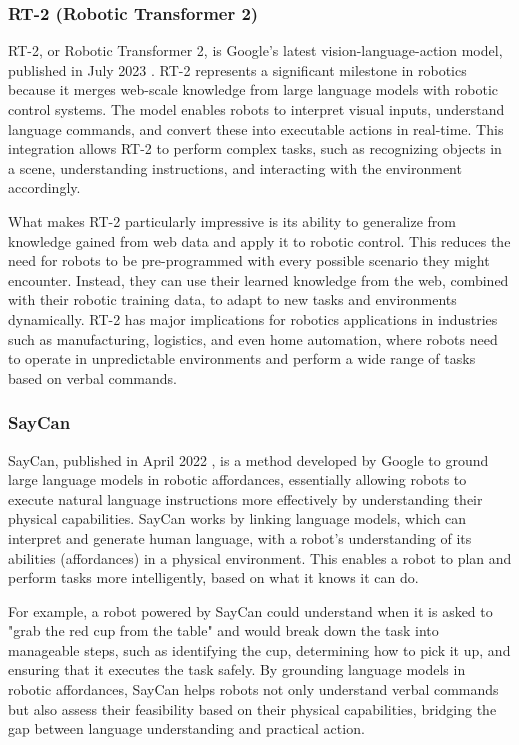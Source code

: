 \subsubsection{RT-2 (Robotic Transformer 2)}

RT-2, or Robotic Transformer 2, is Google's latest vision-language-action model, published in July 2023 \cite{brohan2023rt}. 
RT-2 represents a significant milestone in robotics because it merges web-scale knowledge from large language models with robotic control systems. 
The model enables robots to interpret visual inputs, understand language commands, and convert these into executable actions in real-time. 
This integration allows RT-2 to perform complex tasks, such as recognizing objects in a scene, understanding instructions, and interacting with the environment accordingly.

What makes RT-2 particularly impressive is its ability to generalize from knowledge gained from web data and apply it to robotic control. 
This reduces the need for robots to be pre-programmed with every possible scenario they might encounter. 
Instead, they can use their learned knowledge from the web, combined with their robotic training data, to adapt to new tasks and environments dynamically. 
RT-2 has major implications for robotics applications in industries such as manufacturing, logistics, and even home automation, where robots need to operate in unpredictable environments and perform a wide range of tasks based on verbal commands.

\subsubsection{SayCan}

SayCan, published in April 2022 \cite{ahn2022can}, is a method developed by Google to ground large language models in robotic affordances, essentially allowing robots to execute natural language instructions more effectively by understanding their physical capabilities. 
SayCan works by linking language models, which can interpret and generate human language, with a robot's understanding of its abilities (affordances) in a physical environment. 
This enables a robot to plan and perform tasks more intelligently, based on what it knows it can do.

For example, a robot powered by SayCan could understand when it is asked to "grab the red cup from the table" and would break down the task into manageable steps, such as identifying the cup, determining how to pick it up, and ensuring that it executes the task safely. 
By grounding language models in robotic affordances, SayCan helps robots not only understand verbal commands but also assess their feasibility based on their physical capabilities, bridging the gap between language understanding and practical action.


